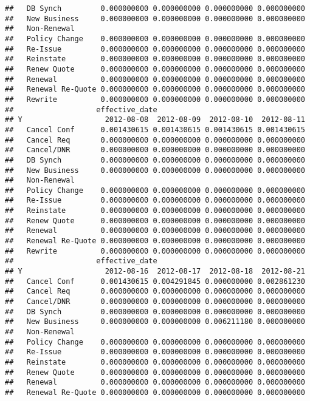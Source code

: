 \documentclass[]{article}
\begin{document}
\begin{verbatim}
##   DB Synch         0.000000000 0.000000000 0.000000000 0.000000000
##   New Business     0.000000000 0.000000000 0.000000000 0.000000000
##   Non-Renewal                                                     
##   Policy Change    0.000000000 0.000000000 0.000000000 0.000000000
##   Re-Issue         0.000000000 0.000000000 0.000000000 0.000000000
##   Reinstate        0.000000000 0.000000000 0.000000000 0.000000000
##   Renew Quote      0.000000000 0.000000000 0.000000000 0.000000000
##   Renewal          0.000000000 0.000000000 0.000000000 0.000000000
##   Renewal Re-Quote 0.000000000 0.000000000 0.000000000 0.000000000
##   Rewrite          0.000000000 0.000000000 0.000000000 0.000000000
##                   effective_date
## Y                   2012-08-08  2012-08-09  2012-08-10  2012-08-11
##   Cancel Conf      0.001430615 0.001430615 0.001430615 0.001430615
##   Cancel Req       0.000000000 0.000000000 0.000000000 0.000000000
##   Cancel/DNR       0.000000000 0.000000000 0.000000000 0.000000000
##   DB Synch         0.000000000 0.000000000 0.000000000 0.000000000
##   New Business     0.000000000 0.000000000 0.000000000 0.000000000
##   Non-Renewal                                                     
##   Policy Change    0.000000000 0.000000000 0.000000000 0.000000000
##   Re-Issue         0.000000000 0.000000000 0.000000000 0.000000000
##   Reinstate        0.000000000 0.000000000 0.000000000 0.000000000
##   Renew Quote      0.000000000 0.000000000 0.000000000 0.000000000
##   Renewal          0.000000000 0.000000000 0.000000000 0.000000000
##   Renewal Re-Quote 0.000000000 0.000000000 0.000000000 0.000000000
##   Rewrite          0.000000000 0.000000000 0.000000000 0.000000000
##                   effective_date
## Y                   2012-08-16  2012-08-17  2012-08-18  2012-08-21
##   Cancel Conf      0.001430615 0.004291845 0.000000000 0.002861230
##   Cancel Req       0.000000000 0.000000000 0.000000000 0.000000000
##   Cancel/DNR       0.000000000 0.000000000 0.000000000 0.000000000
##   DB Synch         0.000000000 0.000000000 0.000000000 0.000000000
##   New Business     0.000000000 0.000000000 0.006211180 0.000000000
##   Non-Renewal                                                     
##   Policy Change    0.000000000 0.000000000 0.000000000 0.000000000
##   Re-Issue         0.000000000 0.000000000 0.000000000 0.000000000
##   Reinstate        0.000000000 0.000000000 0.000000000 0.000000000
##   Renew Quote      0.000000000 0.000000000 0.000000000 0.000000000
##   Renewal          0.000000000 0.000000000 0.000000000 0.000000000
##   Renewal Re-Quote 0.000000000 0.000000000 0.000000000 0.000000000

\end{verbatim}
\end{document}
